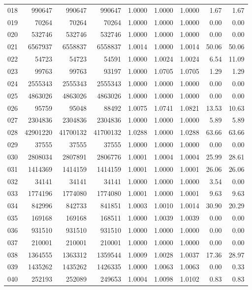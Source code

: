 \begin{longtable}{crrrrrrrr}
018 & 990647 & 990647 & 990647 & 1.0000 & 1.0000 & 1.0000 & 1.67 & 1.67 \\
019 & 70264 & 70264 & 70264 & 1.0000 & 1.0000 & 1.0000 & 0.00 & 0.00 \\
020 & 532746 & 532746 & 532746 & 1.0000 & 1.0000 & 1.0000 & 0.00 & 0.00 \\
021 & 6567937 & 6558837 & 6558837 & 1.0014 & 1.0000 & 1.0014 & 50.06 & 50.06 \\
022 & 54723 & 54723 & 54591 & 1.0000 & 1.0024 & 1.0024 & 6.54 & 11.09 \\
023 & 99763 & 99763 & 93197 & 1.0000 & 1.0705 & 1.0705 & 1.29 & 1.29 \\
024 & 2555343 & 2555343 & 2555343 & 1.0000 & 1.0000 & 1.0000 & 0.00 & 0.00 \\
025 & 4863026 & 4863026 & 4863026 & 1.0000 & 1.0000 & 1.0000 & 0.00 & 0.00 \\
026 & 95759 & 95048 & 88492 & 1.0075 & 1.0741 & 1.0821 & 13.53 & 10.63 \\
027 & 2304836 & 2304836 & 2304836 & 1.0000 & 1.0000 & 1.0000 & 5.89 & 5.89 \\
028 & 42901220 & 41700132 & 41700132 & 1.0288 & 1.0000 & 1.0288 & 63.66 & 63.66 \\
029 & 37555 & 37555 & 37555 & 1.0000 & 1.0000 & 1.0000 & 0.00 & 0.00 \\
030 & 2808034 & 2807891 & 2806776 & 1.0001 & 1.0004 & 1.0004 & 25.99 & 28.61 \\
031 & 1414369 & 1414159 & 1414159 & 1.0001 & 1.0000 & 1.0001 & 26.06 & 26.06 \\
032 & 34141 & 34141 & 34141 & 1.0000 & 1.0000 & 1.0000 & 3.54 & 0.00 \\
033 & 1774196 & 1774080 & 1774080 & 1.0001 & 1.0000 & 1.0001 & 9.63 & 9.63 \\
034 & 842996 & 842733 & 841851 & 1.0003 & 1.0010 & 1.0014 & 30.90 & 20.29 \\
035 & 169168 & 169168 & 168511 & 1.0000 & 1.0039 & 1.0039 & 0.00 & 0.00 \\
036 & 931510 & 931510 & 931510 & 1.0000 & 1.0000 & 1.0000 & 0.00 & 0.00 \\
037 & 210001 & 210001 & 210001 & 1.0000 & 1.0000 & 1.0000 & 0.00 & 0.00 \\
038 & 1364555 & 1363312 & 1359544 & 1.0009 & 1.0028 & 1.0037 & 17.36 & 28.97 \\
039 & 1435262 & 1435262 & 1426335 & 1.0000 & 1.0063 & 1.0063 & 0.00 & 0.33 \\
040 & 252193 & 252089 & 249653 & 1.0004 & 1.0098 & 1.0102 & 0.83 & 0.83 \\

\end{longtable}
